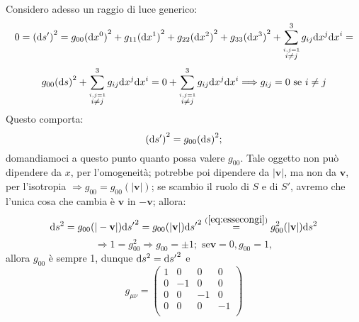\begin{dimostrazione}
  Considero adesso un raggio di luce generico:
  \begin{displaymath}
    0 = {(\mathrm{d} s')}^2 = g_{00}{(\mathrm{d} x^0)}^2 + g_{11}{(\mathrm{d} x^1)}^2 +
    g_{22}{(\mathrm{d} x^2)}^2 + g_{33}{(\mathrm{d} x^3)}^2 +
    \sum_{\stackrel{i,j=1}{i\neq j}}^{3} g_{ij} \mathrm{d} x^j \mathrm{d} x^i =
  \end{displaymath}
  \begin{displaymath}
    g_{00}{(\mathrm{d} s)}^2 + \sum_{\stackrel{i,j=1}{i\neq j}}^{3} g_{ij}
    \mathrm{d} x^j \mathrm{d} x^i = 0 + \sum_{\stackrel{i,j=1}{i\neq j}}^{3} g_{ij}
    \mathrm{d} x^j \mathrm{d} x^i \Longrightarrow g_{ij} = 0 \mbox{ se } i \neq j
  \end{displaymath}
  Questo comporta:
  \begin{equation} {(\mathrm{d}s')}^2 = g_{00} {(\mathrm{d}
      s)}^2; 
    \label{eq:essecongi}
  \end{equation}
  domandiamoci a questo punto quanto possa valere $g_{00}$. Tale
  oggetto non pu\`o dipendere da $x$, per l'omogeneit\`a; potrebbe poi
  dipendere da $|\mathbf{v}|$, ma non da $\mathbf{v}$, per l'isotropia
  $\Longrightarrow g_{00} = g_{00}(|\mathbf{v}|)$; se scambio il ruolo
  di $S$ e di $S'$, avremo che l'unica cosa che cambia \`e
  $\mathbf{v}$ in $-\mathbf{v}$; allora:
\begin{displaymath}
\mathrm{d} s^2 = g_{00} (|-\mathbf{v}|)\mathrm{d} {s'}^2 = g_{00} (|\mathbf{v}|)\mathrm{d}
{s'}^2 \stackrel{(\ref{eq:essecongi})}{=} g_{00}^2 (|\mathbf{v}|)\mathrm{d}
{s}^2 
\end{displaymath}
\begin{displaymath}
\Longrightarrow 1 = g_{00}^2 \Longrightarrow g_{00} = \pm 1; \mbox{ se
} \mathbf{v} = 0, g_{00} = 1,
\end{displaymath}
allora $g_{00}$ \`e sempre 1, dunque $\mathrm{d} s^2 = \mathrm{d} {s'}^2$ e
\begin{displaymath}
  g_{\mu \nu}=\left(
    \begin{array}{rrrr}
      1&0&0&0\\0&-1&0&0\\0&0&-1&0\\0&0&0&-1\\
    \end{array}
  \right)
\end{displaymath}
\end{dimostrazione}
